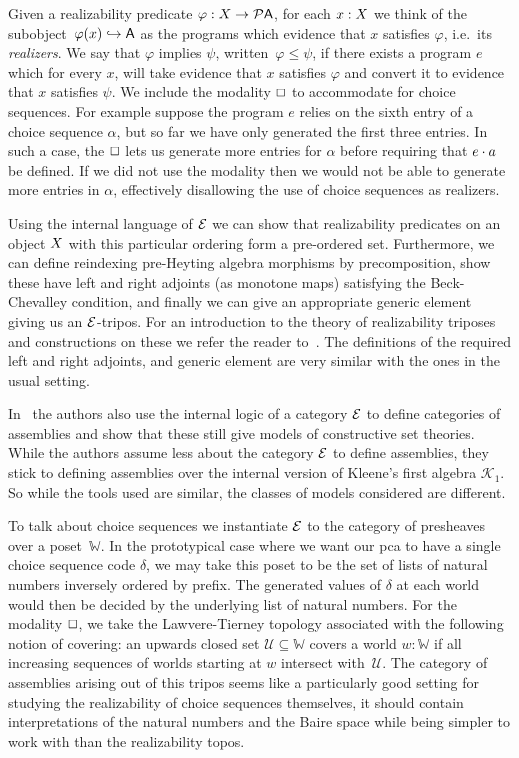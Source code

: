 \documentclass{easychair}
\begin{document}
Given a realizability predicate \(\varphi : {{X}\to{\mathcal{P}{\ensuremath{\mathsf{A}}}}}\), for each \(x : X\)
we think of the subobject~\(\varphi(x) \hookrightarrow \mathsf{A}\) as the programs
which evidence that \(x\) satisfies \(\varphi\), i.e.\ its \textit{realizers}.
%
We say that \(\varphi\) implies \(\psi\), written~\(\varphi\leq\psi\), if there
exists a program \(e\) which for every \(x\), will take evidence that \(x\)
satisfies \(\varphi\) and convert it to evidence that \(x\) satisfies \(\psi\).
%
We include the modality \(\Box\) to accommodate for choice sequences.
%
For example suppose the program \(e\) relies on the sixth entry of a choice
sequence \(\alpha\), but so far we have only generated the first three entries.
%
In such a case, the \(\Box\) lets us generate more entries for \(\alpha\)
before requiring that \({e}\cdot{a}\) be defined.
%
If we did not use the modality then we would not be able to generate more
entries in \(\alpha\), effectively disallowing the use of choice sequences as
realizers.

Using the internal language of \(\mathcal{E}\) we can show that realizability predicates
on an object \(X\) with this particular ordering form a pre-ordered set.
%
Furthermore, we can define reindexing pre-Heyting algebra morphisms by
precomposition, show these have left and right adjoints (as monotone maps)
satisfying the Beck-Chevalley condition, and finally we can give an appropriate
generic element giving us an \(\mathcal{E}\)-tripos.
%
For an introduction to the theory of realizability triposes and constructions on
these we refer the reader to~\cite[\S2]{oostenRealizabilityIntroductionIts2008}.
%
The definitions of the required left and right adjoints, and generic
element are very similar with the ones in the usual setting.

In~\cite{vandenbergAspectsPredicativeAlgebraic2011} the authors also use the
internal logic of a category \(\mathcal{E}\) to define categories of assemblies and show
that these still give models of constructive set theories.
%
While the authors assume less about the category \(\mathcal{E}\) to define assemblies,
they stick to defining assemblies over the internal version of Kleene's first
algebra \(\mathcal{K}_{1}\).
%
So while the tools used are similar, the classes of models considered are
different.

To talk about choice sequences we instantiate \(\mathcal{E}\) to the category of
presheaves over a poset~\(\mathbb{W}\).
%
In the prototypical case where we want our pca to have a single choice sequence
code \(\delta\), we may take this poset to be the set of lists of natural
numbers inversely ordered by prefix.
%
The generated values of \(\delta\) at each world would then be decided by the
underlying list of natural numbers.
%
For the modality \(\Box\), we take the Lawvere-Tierney topology associated
with the following notion of covering: an upwards closed set
\(\mathcal{U} \subseteq \mathbb{W}\) covers a world \(w : \mathbb{W}\) if all
increasing sequences of worlds starting at \(w\) intersect with~\(\mathcal{U}\).
%
The category of assemblies arising out of this tripos seems like a particularly
good setting for studying the realizability of choice sequences themselves,
it should contain interpretations of the natural numbers and the Baire space
while being simpler to work with than the realizability topos.
\end{document}
